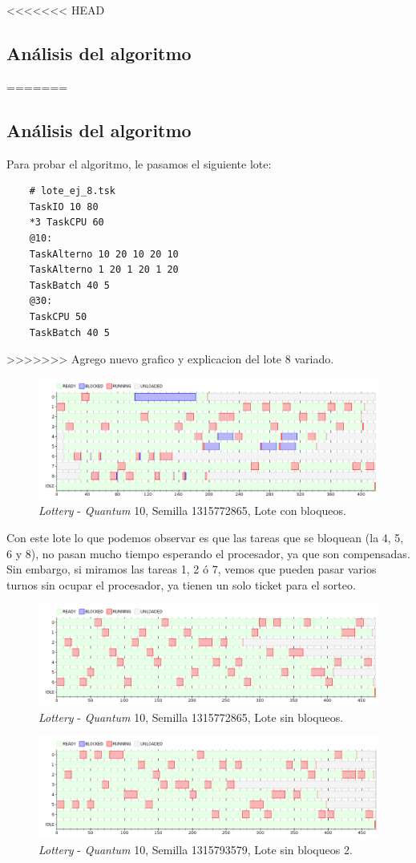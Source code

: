 <<<<<<< HEAD
\subsection{Análisis del algoritmo}
=======
\subsection{An\'alisis del algoritmo}
Para probar el algoritmo, le pasamos el siguiente lote:
\begin{verbatim}
	# lote_ej_8.tsk
	TaskIO 10 80
	*3 TaskCPU 60
	@10:
	TaskAlterno 10 20 10 20 10
	TaskAlterno 1 20 1 20 1 20
	TaskBatch 40 5
	@30:
	TaskCPU 50
	TaskBatch 40 5
\end{verbatim}

>>>>>>> Agrego nuevo grafico y explicacion del lote 8 variado.
\begin{figure}[H]
\centering
\includegraphics[scale=0.5]{./graficos/out_ej_8.png}
\caption{\emph{Lottery} - \emph{Quantum} 10, Semilla 1315772865, Lote con bloqueos.}
\end{figure} 

Con este lote lo que podemos observar es que las tareas que se bloquean (la 4, 5, 6 y 8), no pasan mucho tiempo esperando el procesador, ya que son compensadas. Sin embargo, si miramos las tareas 1, 2 ó 7, vemos que pueden pasar varios turnos sin ocupar el procesador, ya tienen un solo ticket para el sorteo.

\begin{figure}[H]
\centering
\includegraphics[scale=0.5]{./graficos/out_ej_8_2.png}
\caption{\emph{Lottery} - \emph{Quantum} 10, Semilla 1315772865, Lote sin bloqueos.}
\end{figure} 

\begin{figure}[H]
\centering
\includegraphics[scale=0.5]{./graficos/out_ej_8_3.png}
\caption{\emph{Lottery} - \emph{Quantum} 10, Semilla 1315793579, Lote sin bloqueos 2.}
\end{figure} 

